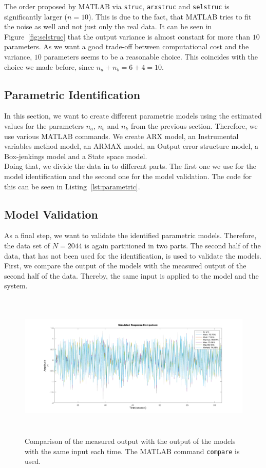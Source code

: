 \documentclass{scrartcl}
\begin{document}
The order proposed by MATLAB via \texttt{struc}, \texttt{arxstruc} and \texttt{selstruc} is significantly larger ($n = 10$). This is due to the fact, that MATLAB tries to fit the noise as well and not just only the real data. It can be seen in Figure~\ref{fig:selstruc} that the output variance is almost constant for more than $10$ parameters. As we want a good trade-off between computational cost and the variance, $10$ parameters seems to be a reasonable choice. This coincides with the choice we made before, since $n_a + n_b = 6 + 4 = 10$. 

\subsection{Parametric Identification}
In this section, we want to create different parametric models using the estimated values for the parameters $n_a$, $n_b$ and $n_k$ from the previous section. Therefore, we use various MATLAB commands. We create ARX model, an Instrumental variables method model, an ARMAX model, an Output error structure model, a  Box-jenkings model and a State space model.\\
Doing that, we divide the data in to different parts. The first one we use for the model identification and the second one for the model validation. 
The code for this can be seen in Listing~\ref{lst:parametric}.  

\subsection{Model Validation}
As a final step, we want to validate the identified parametric models. Therefore, the data set of $N = 2044$ is again partitioned in two parts. The second half of the data, that has not been used for the identification, is used to validate the models. \\
First, we compare the output of the models with the measured output of the second half of the data.  Thereby, the same input is applied to the model and the system. 

\begin{figure}[h]
	\centering
	\includegraphics[height=7cm]{figures/comparison.png}
	\caption{Comparison of the measured output with the output of the models with the same input each time. The MATLAB command \texttt{compare} is used. }\label{fig:comparison }
\end{figure}
\end{document}

